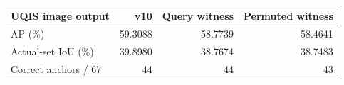 \begin{tabular}{lrrr}
\toprule
UQIS image output & v10 & Query witness & Permuted witness \\
\midrule
AP (\%) & 59.3088 & 58.7739 & 58.4641 \\
Actual-set IoU (\%) & 39.8980 & 38.7674 & 38.7483 \\
Correct anchors / 67 & 44 & 44 & 43 \\
\bottomrule
\end{tabular}
